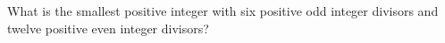 What is the smallest positive integer with six positive odd integer divisors and twelve positive even integer divisors?